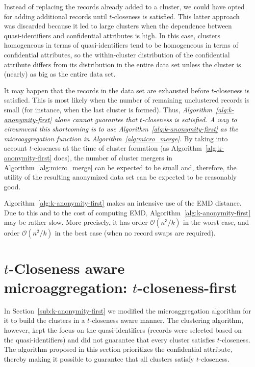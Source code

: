 \documentclass[10pt,journal,compsoc]{IEEEtran}
\theoremstyle{definition}
\theoremstyle{plain}
\begin{document}
Instead of replacing the records already added to a cluster, we could have opted for
adding additional records until $t$-closeness is satisfied. This latter approach was 
discarded because it led to large clusters when the dependence between 
quasi-identifiers
and confidential attributes is high.
In this case,
clusters homogeneous in terms of quasi-identifiers tend
to be homogeneous in terms of confidential attributes, 
so the within-cluster distribution of the confidential attribute
differs from its distribution in the entire data set unless
the cluster is (nearly) as big as the entire data set. 

It may happen that the records in 
the data set are exhausted before $t$-closeness
is satisfied. This is most likely when the number of remaining
unclustered records is small (for instance, when the last cluster
is formed). 
Thus, {\em Algorithm~\ref{alg:k-anonymity-first} alone
cannot guarantee that $t$-closeness is satisfied.
A way to circumvent this shortcoming is 
to use Algorithm~\ref{alg:k-anonymity-first}
as the microaggregation function in Algorithm~\ref{alg:micro_merge}.}
By taking into account $t$-closeness at the time 
of cluster formation (as Algorithm~\ref{alg:k-anonymity-first} does),
the number of cluster mergers in Algorithm~\ref{alg:micro_merge} 
can be expected to be small and, therefore, the utility 
of the resulting anonymized data set can be expected to be reasonably
good.

Algorithm~\ref{alg:k-anonymity-first} makes an intensive use of the EMD distance.
Due to this and to the cost of computing EMD, 
Algorithm~\ref{alg:k-anonymity-first}
may be rather slow. More precisely, it has order $\mathcal{O}(n^3/k)$ in 
the worst case, and order
$\mathcal{O}(n^2/k)$ in the best case (when no record swaps are required).

\section{$t$-Closeness aware microaggregation: $t$-closeness-first\label{sub:t-closeness-first}}

In Section~\ref{sub:k-anonymity-first} we modified the microaggregation
algorithm for it to build the clusters in a $t$-closeness aware manner.
The clustering algorithm, however, kept the focus on the quasi-identifiers
(records were selected based on the quasi-identifiers) and did not
guarantee that every cluster satisfies $t$-closeness. The algorithm 
proposed in this section prioritizes the confidential
attribute, thereby making it possible to guarantee that all clusters
satisfy $t$-closeness.
\end{document}

